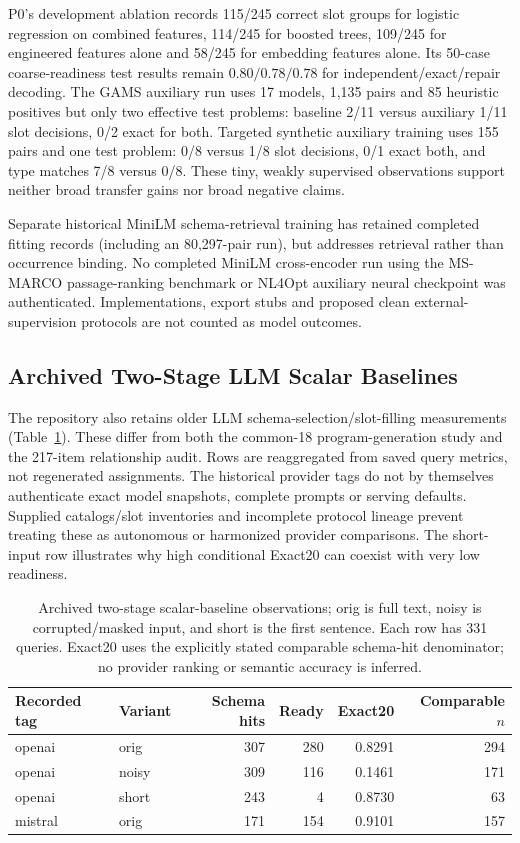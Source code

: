 P0's development ablation records 115/245 correct slot groups for logistic regression on combined features, 114/245 for boosted trees, 109/245 for engineered features alone and 58/245 for embedding features alone. Its 50-case coarse-readiness test results remain $0.80/0.78/0.78$ for independent/exact/repair decoding. The GAMS auxiliary run uses 17 models, 1,135 pairs and 85 heuristic positives but only two effective test problems: baseline 2/11 versus auxiliary 1/11 slot decisions, 0/2 exact for both. Targeted synthetic auxiliary training uses 155 pairs and one test problem: 0/8 versus 1/8 slot decisions, 0/1 exact both, and type matches 7/8 versus 0/8. These tiny, weakly supervised observations support neither broad transfer gains nor broad negative claims.

Separate historical MiniLM schema-retrieval training has retained completed fitting records (including an 80,297-pair run), but addresses retrieval rather than occurrence binding. No completed MiniLM cross-encoder run using the MS-MARCO passage-ranking benchmark or NL4Opt auxiliary neural checkpoint was authenticated. Implementations, export stubs and proposed clean external-supervision protocols are not counted as model outcomes.

\subsection{Archived Two-Stage LLM Scalar Baselines}
The repository also retains older LLM schema-selection/slot-filling measurements (Table~\ref{tab:archived-scalar-llm}). These differ from both the common-18 program-generation study and the 217-item relationship audit. Rows are reaggregated from saved query metrics, not regenerated assignments. The historical provider tags do not by themselves authenticate exact model snapshots, complete prompts or serving defaults. Supplied catalogs/slot inventories and incomplete protocol lineage prevent treating these as autonomous or harmonized provider comparisons. The short-input row illustrates why high conditional Exact20 can coexist with very low readiness.

\begin{table}[htbp]\centering\small
\caption{Archived two-stage scalar-baseline observations; orig is full text, noisy is corrupted/masked input, and short is the first sentence. Each row has 331 queries. Exact20 uses the explicitly stated comparable schema-hit denominator; no provider ranking or semantic accuracy is inferred.}\label{tab:archived-scalar-llm}
\begin{tabular}{@{}llrrrr@{}}\toprule
Recorded tag & Variant & Schema hits & Ready & Exact20 & Comparable $n$\\\midrule
openai & orig & 307 & 280 & 0.8291 & 294\\
openai & noisy & 309 & 116 & 0.1461 & 171\\
openai & short & 243 & 4 & 0.8730 & 63\\
mistral & orig & 171 & 154 & 0.9101 & 157\\
\bottomrule\end{tabular}\end{table}

